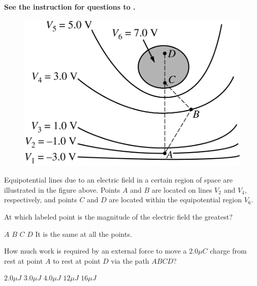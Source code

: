 \textbf{See the instruction for questions  to .}

\begin{figure}[H]
\centering
\includegraphics[scale=0.25]{images/img-013-039.png}
\end{figure}

Equipotential lines due to an electric field in a certain region of space are illustrated in the figure above. Points $A$ and $B$ are located on lines $V_{2}$ and $V_{4}$, respectively, and points $C$ and $D$ are located within the equipotential region $V_{6}$.

\begin{questions}\setcounter{question}{29}\question
At which labeled point is the magnitude of the electric field the greatest?

\begin{oneparchoices}
\choice $A$
\choice $B$
\choice $C$
\choice $D$
\choice It is the same at all the points.
\end{oneparchoices}\end{questions}

\begin{questions}\setcounter{question}{30}\question
How much work is required by an external force to move a $2.0 \unit{\mu C}$ charge from rest at point $A$ to rest at point $D$ via the path $ABCD$?

\begin{oneparchoices}
\choice $2.0 \unit{\mu J}$
\choice $3.0 \unit{\mu J}$
\choice $4.0 \unit{\mu J}$
\choice $12 \unit{\mu J}$
\choice $16 \unit{\mu J}$
\end{oneparchoices}\end{questions}

